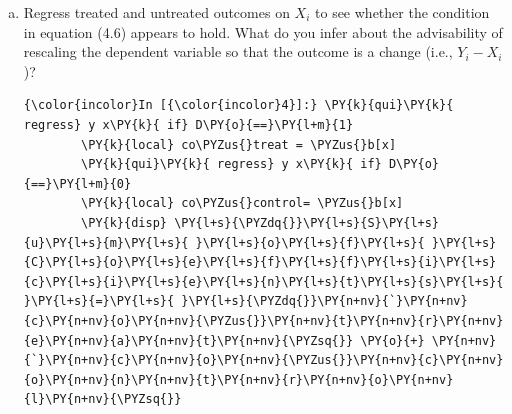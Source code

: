 \documentclass[11pt,notitlepage]{article}\usepackage[]{graphicx}\usepackage[]{color}
\makeatletter
\newenvironment{kframe}{%
 \def\at@end@of@kframe{}%
 \ifinner\ifhmode%
  \def\at@end@of@kframe{\end{minipage}}%
  \begin{minipage}{\columnwidth}%
 \fi\fi%
 \def\FrameCommand##1{\hskip\@totalleftmargin \hskip-\fboxsep
 \colorbox{shadecolor}{##1}\hskip-\fboxsep
     \hskip-\linewidth \hskip-\@totalleftmargin \hskip\columnwidth}%
 \MakeFramed {\advance\hsize-\width
   \@totalleftmargin\z@ \linewidth\hsize
   \@setminipage}}%
 {\par\unskip\endMakeFramed%
 \at@end@of@kframe}
\newenvironment{knitrout}{}{} %
\makeatother
\begin{document}
\begin{enumerate}[a)]
\begin{knitrout}
\begin{kframe}
\begin{Verbatim}[commandchars=\\\{\}]
------------------------------------------------------------------------------
           y |      Coef.   Std. Err.      t    P>|t|     [95\% Conf. Interval]
-------------+----------------------------------------------------------------
           D |       10.7   4.709313     2.27   0.029     1.166494    20.23351
       \_cons |      26.85   3.329987     8.06   0.000     20.10879    33.59121
------------------------------------------------------------------------------
    \end{Verbatim}

    \begin{Verbatim}[commandchars=\\\{\}]
{\color{incolor}In [{\color{incolor}3}]:} \PY{k}{disp} \PY{l+s}{\PYZdq{}}\PY{l+s}{A}\PY{l+s}{T}\PY{l+s}{E}\PY{l+s}{ }\PY{l+s}{=}\PY{l+s}{\PYZdq{}} treat\PYZus{}mean \PY{o}{\PYZhy{}} control\PYZus{}mean
        
        \PY{k}{global} tau = treat\PYZus{}mean \PY{o}{\PYZhy{}} control\PYZus{}mean
\end{Verbatim}

    \begin{Verbatim}[commandchars=\\\{\}]
ATE =10.7
    \end{Verbatim}
\end{kframe}
\end{knitrout}

The estimate obtained with OLS regression (10.7) is identical to the estimate obtained with difference-in-means (10.7).
\item Regress treated and untreated outcomes on $X_i$ to see whether the condition in equation (4.6) appears to hold.  What do you infer about the advisability of rescaling the dependent variable so that the outcome is a change (i.e., $Y_i-X_i$)?\\
\begin{knitrout}
\color{fgcolor}\begin{kframe}
    \begin{Verbatim}[commandchars=\\\{\}]
{\color{incolor}In [{\color{incolor}4}]:} \PY{k}{qui}\PY{k}{ regress} y x\PY{k}{ if} D\PY{o}{==}\PY{l+m}{1}
        \PY{k}{local} co\PYZus{}treat = \PYZus{}b[x]
        \PY{k}{qui}\PY{k}{ regress} y x\PY{k}{ if} D\PY{o}{==}\PY{l+m}{0}
        \PY{k}{local} co\PYZus{}control= \PYZus{}b[x]
        \PY{k}{disp} \PY{l+s}{\PYZdq{}}\PY{l+s}{S}\PY{l+s}{u}\PY{l+s}{m}\PY{l+s}{ }\PY{l+s}{o}\PY{l+s}{f}\PY{l+s}{ }\PY{l+s}{C}\PY{l+s}{o}\PY{l+s}{e}\PY{l+s}{f}\PY{l+s}{f}\PY{l+s}{i}\PY{l+s}{c}\PY{l+s}{i}\PY{l+s}{e}\PY{l+s}{n}\PY{l+s}{t}\PY{l+s}{s}\PY{l+s}{ }\PY{l+s}{=}\PY{l+s}{ }\PY{l+s}{\PYZdq{}}\PY{n+nv}{`}\PY{n+nv}{c}\PY{n+nv}{o}\PY{n+nv}{\PYZus{}}\PY{n+nv}{t}\PY{n+nv}{r}\PY{n+nv}{e}\PY{n+nv}{a}\PY{n+nv}{t}\PY{n+nv}{\PYZsq{}} \PY{o}{+} \PY{n+nv}{`}\PY{n+nv}{c}\PY{n+nv}{o}\PY{n+nv}{\PYZus{}}\PY{n+nv}{c}\PY{n+nv}{o}\PY{n+nv}{n}\PY{n+nv}{t}\PY{n+nv}{r}\PY{n+nv}{o}\PY{n+nv}{l}\PY{n+nv}{\PYZsq{}}
\end{Verbatim}


\end{kframe}
\end{knitrout}
\end{enumerate}
\end{document}
